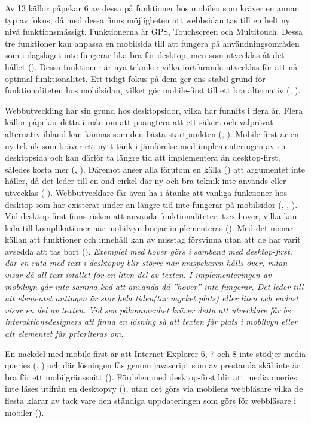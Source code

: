 \documentclass[11pt]{article}
\begin{document}
Av 13 källor påpekar 6 av dessa på funktioner hos mobilen som kräver en annan typ av fokus, då med dessa finns möjligheten att webbsidan tas till en helt ny nivå funktionsmässigt. Funktionerna är GPS, Touchscreen och Multitouch. Dessa tre funktioner kan anpassa en mobilsida till att fungera på användningsområden som i dagsläget inte fungerar lika bra för desktop, men som utvecklas åt det hållet (\cite{sweclock}). Dessa funktioner är nya tekniker vilka fortfarande utvecklas för att nå optimal funktionalitet. Ett tidigt fokus på dem ger ens stabil grund för funktionaliteten hos mobilsidan, vilket gör mobile-first till ett bra alternativ (\cite{techradar}, \cite{othermedia}).
 
Webbutveckling har sin grund hos desktopsidor, vilka har funnits i flera år. Flera källor påpekar detta i mån om att poängtera att ett säkert och välprövat alternativ ibland kan kännas som den bästa startpunkten (\cite{armstrong}, \cite{readyartwork}). Mobile-first är en ny teknik som kräver ett nytt tänk i jämförelse med implementeringen av en desktopsida och kan därför ta längre tid att implementera än desktop-first, således kosta mer (\cite{readyartwork}, \cite{marcuspope}). Däremot anser alla förutom en källa (\cite{armstrong}) att argumentet inte håller, då det leder till en ond cirkel där ny och bra teknik inte används eller utvecklas (\cite{designshack} \cite{marcuspope}). Webbutvecklare får även ha i åtanke att vanliga funktioner hos desktop som har existerat under än längre tid inte fungerar på mobilsidor (\cite{responsivedesign}, \cite{designshack}, \cite{webinsation}). Vid desktop-first finns risken att använda funktionaliteter, t.ex hover, vilka kan leda till komplikationer när mobilvyn börjar implementeras (\cite{readyartwork}). Med det menar källan att funktioner och innehåll kan av misstag försvinna utan att de har varit avsedda att tas bort (\cite{readyartwork}). \textit{Exemplet med hover görs i samband med desktop-first, där en ruta med text i desktopvy blir större när muspekaren hålls över, rutan visar då all text istället för en liten del av texten. I implementeringen av mobilvyn går inte samma kod att använda då ”hover” inte fungerar. Det leder till att elementet antingen är stor hela tiden(tar mycket plats) eller liten och endast visar en del av texten. Vid sen påkommenhet kräver detta att utvecklare får be interaktionsdesigners att finna en lösning så att texten får plats i mobilvyn eller att elementet får prioriteras om.}
 
 En nackdel med mobile-first är att Internet Explorer 6, 7 och 8 inte stödjer media queries (\cite{marcuspope}, \cite{neocreo}) och där lösningen fås genom javascript som av prestanda skäl inte är bra för ett mobilgränssnitt (\cite{responsivedesign}). Fördelen med desktop-first blir att media queries inte läses utifrån en desktopvy (\cite{neocreo}), utan det görs via mobilens webbläsare vilka de flesta klarar av tack vare den ständiga uppdateringen som görs för webbläsare i mobiler (\cite{webinsation}).
 
\end{document}
